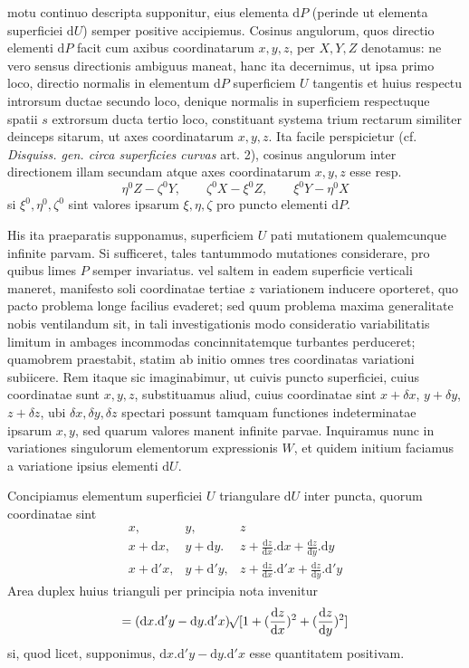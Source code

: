motu continuo descripta supponitur, eius elementa $\mathrm{d}P$ (perinde ut elementa superficiei $\mathrm{d}U$) semper positive accipiemus. Cosinus angulorum, quos directio elementi $\mathrm{d}P$ facit cum axibus coordinatarum $x,y,z$, per $X,Y,Z$ denotamus: ne vero sensus directionis ambiguus maneat, hanc ita decernimus, ut ipsa primo loco, directio normalis in elementum $\mathrm{d}P$ superficiem $U$ tangentis et huius respectu introrsum ductae secundo loco, denique normalis in superficiem respectuque spatii $s$ extrorsum ducta tertio loco, constituant systema trium rectarum similiter deinceps sitarum, ut axes coordinatarum $x,y,z$. Ita facile perspicietur (cf. \textit{Disquiss. gen. circa superficies curvas} art. 2), cosinus angulorum inter directionem illam secundam atque axes coordinatarum $x,y,z$ esse resp.
\[
\eta^0Z-\zeta^0Y,\qquad \zeta^0X-\xi^0Z,\qquad \xi^0Y-\eta^0X
\]
si $\xi^0,\eta^0,\zeta^0$ sint valores ipsarum $\xi,\eta,\zeta$ pro puncto elementi $\mathrm{d}P$.

His ita praeparatis supponamus, superficiem $U$ pati mutationem qualemcunque infinite parvam. Si sufficeret, tales tantummodo mutationes considerare, pro quibus limes $P$ semper invariatus. vel saltem in eadem superficie verticali maneret, manifesto soli coordinatae tertiae $z$ variationem inducere oporteret, quo pacto problema longe facilius evaderet; sed quum problema maxima generalitate nobis ventilandum sit, in tali investigationis modo consideratio variabilitatis limitum in ambages incommodas concinnitatemque turbantes perduceret; quamobrem praestabit, statim ab initio omnes tres coordinatas variationi subiicere. Rem itaque sic imaginabimur, ut cuivis puncto superficiei, cuius coordinatae sunt $x,y,z$, substituamus aliud, cuius coordinatae sint $x+\delta x$, $y+\delta y$, $z+\delta z$, ubi $\delta x,\delta y,\delta z$ spectari possunt tamquam functiones indeterminatae ipsarum $x,y$, sed quarum valores manent infinite parvae. Inquiramus nunc in variationes singulorum elementorum expressionis $W$, et quidem initium faciamus a variatione ipsius elementi $\mathrm{d}U$.

Concipiamus elementum superficiei $U$ triangulare $\mathrm{d}U$ inter puncta, quorum coordinatae sint
\[
\begin{array}{lll}
x,&y,&z\\
x+\mathrm{d}x,&y+\mathrm{d}y.&z+\frac{\mathrm{d}z}{\mathrm{d}x}.\mathrm{d}x+\frac{\mathrm{d}z}{\mathrm{d}y}.\mathrm{d}y\\
x+\mathrm{d}'x,&y+\mathrm{d}'y,&z+\frac{\mathrm{d}z}{\mathrm{d}x}.\mathrm{d}'x+\frac{\mathrm{d}z}{\mathrm{d}y}.\mathrm{d}'y
\end{array}
\]
Area duplex huius trianguli per principia nota invenitur
\[
=(\mathrm{d}x.\mathrm{d}'y-\mathrm{d}y.\mathrm{d}'x)\mathord{{}^{}\!\surd}[1+(\frac{\mathrm{d}z}{\mathrm{d}x})^2+(\frac{\mathrm{d}z}{\mathrm{d}y})^2]
\]
si, quod licet, supponimus, $\mathrm{d}x.\mathrm{d}'y-\mathrm{d}y.\mathrm{d}'x$ esse quantitatem positivam.

